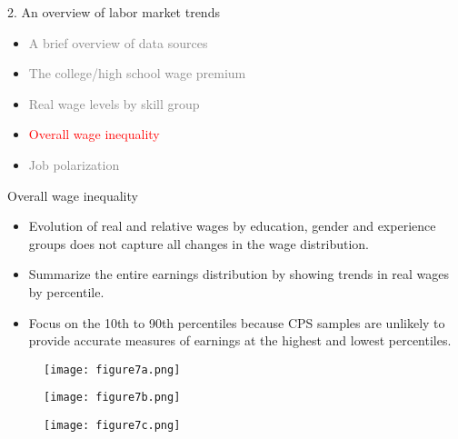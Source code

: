 \documentclass[notes=show]{beamer}
\begin{document}
\begin{frame}{2. An overview of labor market trends}
\begin{itemize}
\item[\textcolor{gray}{2.1}] \textcolor{gray}{A brief overview of data sources} \medskip
\item[\textcolor{gray}{2.2}] \textcolor{gray}{The college/high school wage premium} \medskip
\item[\textcolor{gray}{2.3}] \textcolor{gray}{Real wage levels by skill group} \medskip
\item[\textcolor{red}{2.4}] \textcolor{red}{Overall wage inequality} \medskip
\item [\textcolor{gray}{2.5}] \textcolor{gray}{Job polarization}
\end{itemize}
\end{frame}

\begin{frame}{Overall wage inequality}
\begin{itemize}
\item Evolution of real and relative wages by education, gender and experience groups does not capture all changes in the wage distribution. \medskip
\item Summarize the entire earnings distribution by showing trends in real wages by percentile. \medskip
\item Focus on the 10th to 90th percentiles because CPS samples are unlikely to provide accurate measures of earnings at the highest and lowest percentiles.
\end{itemize}
\end{frame}

\newpage
\begin{center}
\begin{figure}
\texttt{[image: figure7a.png]}
\end{figure} 
\end{center}
\newpage

\newpage
\begin{center}
\begin{figure}
\texttt{[image: figure7b.png]}
\end{figure} 
\end{center}
\newpage

\newpage
\begin{center}
\begin{figure}
\texttt{[image: figure7c.png]}
\end{figure} 
\end{center}
\newpage
\end{document}
